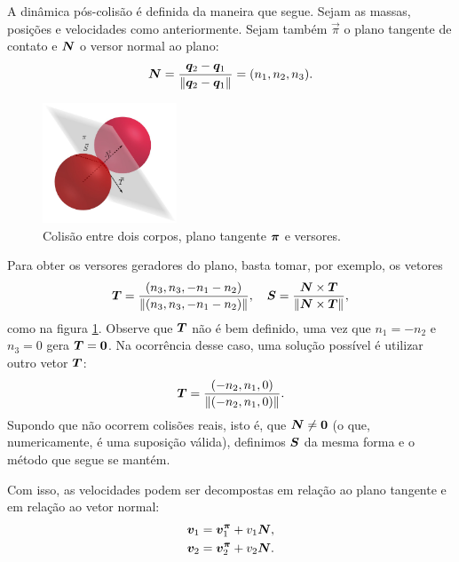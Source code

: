 
A dinâmica pós-colisão é definida da maneira que segue. Sejam as massas, posições e velocidades como anteriormente. Sejam também $\vec \pi$ o plano tangente de contato e $\bm N$ o versor normal ao plano:
\begin{equation}
    \bm N = \dfrac{\bm q_2 - \bm q_1}{\left\Vert \bm q_2 - \bm q_1 \right\Vert} = (n_1, n_2, n_3).
\end{equation}

\begin{figure}[H]
    \centering
    \includegraphics[width=4cm]{tcc/img/colisao_corrigida.jpg}
    \caption{Colisão entre dois corpos, plano tangente $\bm \pi$ e versores.}
    \label{fig:colisao-3d}
\end{figure}

Para obter os versores geradores do plano, basta tomar, por exemplo, os vetores
\begin{equation*}
    \bm T = \dfrac{(n_3, n_3,-n_1 - n_2)}{\left\Vert (n_3, n_3,-n_1 - n_2) \right\Vert},
    \quad
    \bm S = \dfrac{\bm N \times \bm T}{\left\Vert \bm N \times \bm T \right\Vert},
\end{equation*}
como na figura \ref{fig:colisao-3d}. Observe que $\bm T$ não é bem definido, uma vez que $n_1 = -n_2$ e $n_3 = 0$ gera $\bm T = \bm 0$. Na ocorrência desse caso, uma solução possível é utilizar outro vetor $\bm T$:
\begin{equation*}
    \bm T = \dfrac{(-n_2, n_1, 0)}{\left\Vert (-n_2, n_1, 0) \right\Vert}.
\end{equation*}
Supondo que não ocorrem colisões reais, isto é, que $\bm N \neq \bm 0$ (o que, numericamente, é uma suposição válida), definimos $\bm S$ da mesma forma e o método que segue se mantém.

Com isso, as velocidades podem ser decompostas em relação ao plano tangente e em relação ao vetor normal:
\begin{align*}
    \bm v_1 &= \bm v_1^{\bm \pi} + v_1 \bm N,
    \\
    \bm v_2 &= \bm v_2^{\bm \pi} + v_2 \bm N.
\end{align*}

